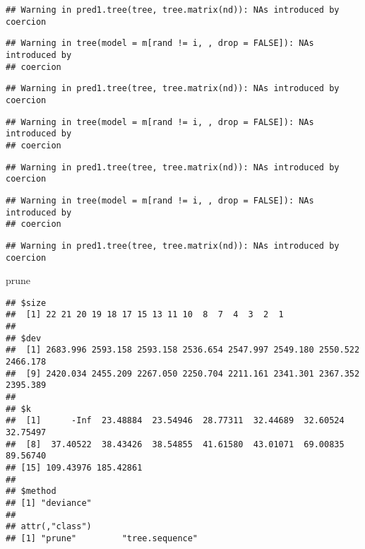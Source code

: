 \documentclass[
]{article}
\newenvironment{Shaded}{\begin{snugshade}}{\end{snugshade}}
\newcommand{\NormalTok}[1]{#1}
\begin{document}
\begin{verbatim}
## Warning in pred1.tree(tree, tree.matrix(nd)): NAs introduced by coercion
\end{verbatim}

\begin{verbatim}
## Warning in tree(model = m[rand != i, , drop = FALSE]): NAs introduced by
## coercion
\end{verbatim}

\begin{verbatim}
## Warning in pred1.tree(tree, tree.matrix(nd)): NAs introduced by coercion
\end{verbatim}

\begin{verbatim}
## Warning in tree(model = m[rand != i, , drop = FALSE]): NAs introduced by
## coercion
\end{verbatim}

\begin{verbatim}
## Warning in pred1.tree(tree, tree.matrix(nd)): NAs introduced by coercion
\end{verbatim}

\begin{verbatim}
## Warning in tree(model = m[rand != i, , drop = FALSE]): NAs introduced by
## coercion
\end{verbatim}

\begin{verbatim}
## Warning in pred1.tree(tree, tree.matrix(nd)): NAs introduced by coercion
\end{verbatim}

\begin{Shaded}
\begin{Highlighting}[]
\NormalTok{prune}
\end{Highlighting}
\end{Shaded}

\begin{verbatim}
## $size
##  [1] 22 21 20 19 18 17 15 13 11 10  8  7  4  3  2  1
## 
## $dev
##  [1] 2683.996 2593.158 2593.158 2536.654 2547.997 2549.180 2550.522 2466.178
##  [9] 2420.034 2455.209 2267.050 2250.704 2211.161 2341.301 2367.352 2395.389
## 
## $k
##  [1]      -Inf  23.48884  23.54946  28.77311  32.44689  32.60524  32.75497
##  [8]  37.40522  38.43426  38.54855  41.61580  43.01071  69.00835  89.56740
## [15] 109.43976 185.42861
## 
## $method
## [1] "deviance"
## 
## attr(,"class")
## [1] "prune"         "tree.sequence"
\end{verbatim}
\end{document}
